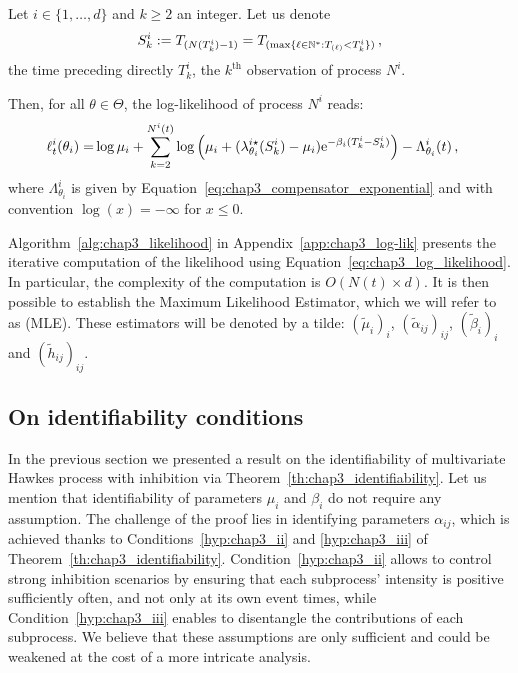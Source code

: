     \begin{corollary}\label{cor:chap3_mle}
        Let \(i \in \{1, \dots, d\}\) and \(k\geq 2\) an integer.
        Let us denote
        \[
          S_k^i := T\park[N(T_k^i)-1]
          = T\park[\max\{\ell \in \mathbb N^* : {T\park[\ell]} < T_k^i\}] \,,
        \]
        the time preceding directly \(T_k^i\), the \(k^{\text{th}}\) observation of process \(N^i\).
        
        Then, for all \(\theta \in \Theta\),
        the log-likelihood of process \(N^i\) reads:
        \begin{align}\label{eq:chap3_log_likelihood}
            \ell^i_t(\theta_i) = &\log{\mu_i} + \sum_{k=2}^{N^i(t)}{\log{\adaptedpar{\mu_i + (\lambda^{i\star}_{\theta_i}(S_k^i) - \mu_i)\mathrm{e}^{-\beta_i(T_k^i - S_k^i)}}}} - \Lambda^i_{\theta_i}(t)\,,
        \end{align} where $\Lambda^i_{\theta_i}$ is given by Equation~\eqref{eq:chap3_compensator_exponential} and with convention $\log{(x)} = -\infty$ for $x\leq 0$.

    \end{corollary}

    Algorithm~\ref{alg:chap3_likelihood} in Appendix~\ref{app:chap3_log-lik} presents the iterative computation of the likelihood using Equation~\eqref{eq:chap3_log_likelihood}. In particular, the complexity of the computation is $O(N(t)\times d)$.
    It is then possible to establish the Maximum Likelihood Estimator, which we will refer to as (MLE). These estimators will be denoted by a tilde: $(\tilde\mu_i)_i$, $(\tilde\alpha_{ij})_{ij}$, $(\tilde\beta_i)_i$ and $(\tilde h_{ij})_{ij}$.

\subsection{On identifiability conditions}\label{sec:chap3_identifiability}

        In the previous section we presented a result on the identifiability of multivariate Hawkes process with inhibition via Theorem~\ref{th:chap3_identifiability}.
        Let us mention that identifiability of parameters \(\mu_i\) and \(\beta_i\) do not require any assumption.
	  The challenge of the proof lies in identifying parameters \(\alpha_{ij}\), which is achieved thanks to Conditions~\ref{hyp:chap3_ii} and \ref{hyp:chap3_iii} of Theorem~\ref{th:chap3_identifiability}.
	  Condition~\ref{hyp:chap3_ii} allows to control strong inhibition scenarios by ensuring that each subprocess' intensity is positive sufficiently often, and not only at its own event times,
	  while Condition~\ref{hyp:chap3_iii} enables to disentangle the contributions of each subprocess.
	  We believe that these assumptions are only sufficient and could be weakened at the cost of a more intricate analysis.

